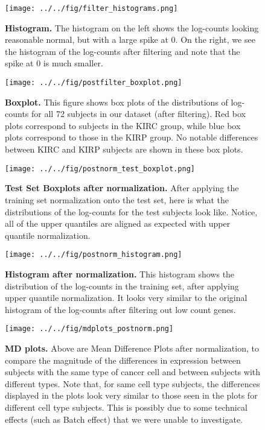 \begin{figure}[H]
  \centering
    \texttt{[image: ../../fig/filter\_histograms.png]}
\caption{\textbf{Histogram.} The histogram on the left shows the log-counts looking
  reasonable normal, but with a large spike at 0.  On the right, we see the
  histogram of the log-counts after filtering and note that the spike at 0 is
  much smaller.}
   \label{fig:histogram}
\end{figure}


\begin{figure}[H]
  \centering
    \texttt{[image: ../../fig/postfilter\_boxplot.png]}
\caption{\textbf{Boxplot.} This figure shows box plots of the distributions of
  log-counts for all 72 subjects in our dataset (after filtering). Red 	box
  plots correspond to subjects in the KIRC group, while blue box plots correspond
  to those in the KIRP group. No notable differences between KIRC and KIRP
  subjects are shown in these box plots.}
   \label{fig:boxplot}
\end{figure}


\begin{figure}[H]
  \centering
    \texttt{[image: ../../fig/postnorm\_test\_boxplot.png]}
\caption{\textbf{Test Set Boxplots after normalization.} After applying the training
  set normalization onto the test set, here is what the distributions of the
  log-counts for the test subjects look like. Notice, all of the upper quantiles
  are aligned as expected with upper quantile normalization.}
   \label{fig:boxplotpost}
\end{figure}


\begin{figure}[H]
  \centering
    \texttt{[image: ../../fig/postnorm\_histogram.png]}
\caption{\textbf{Histogram after normalization.} This histogram shows the distribution
  of the log-counts in the training set, after applying upper quantile
  normalization. It looks very similar to the original histogram of the
  log-counts after filtering out low count genes.}
   \label{fig:histogram}
\end{figure}

\begin{figure}[H]
  \centering
    \texttt{[image: ../../fig/mdplots\_postnorm.png]}
\caption{\textbf{MD plots.} Above are Mean Difference Plots after normalization, to
  compare the magnitude of the differences in expression between subjects with
  the same type of cancer cell and between subjects with different types.  Note
  that, for same cell type subjects, the differences displayed in the plots look
  very similar to those seen in the plots for different cell type subjects. This
  is possibly due to some technical effects (such as Batch
  effect) that we were unable to investigate.}
   \label{fig:mdplot}
\end{figure}

